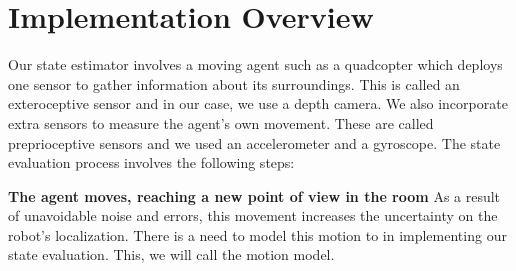 \documentclass[]{article}
\begin{document}
{%

\section{Implementation Overview}
\label{sub:implementation_overview}
Our state estimator involves a moving agent such as a quadcopter which deploys one sensor to gather information about its surroundings. This is called an exteroceptive sensor and in our case, we use a depth camera. We also incorporate extra sensors to measure the agent's own movement. These are called preprioceptive sensors and we used an accelerometer and a gyroscope. The state evaluation process involves the following steps:

\textbf{The agent moves, reaching a new point of view in the room} As a result of unavoidable noise
and errors, this movement increases the uncertainty on the robot's localization.
There is a need to model this motion to in implementing our state evaluation. This, we will call the motion model.

}
\end{document}
